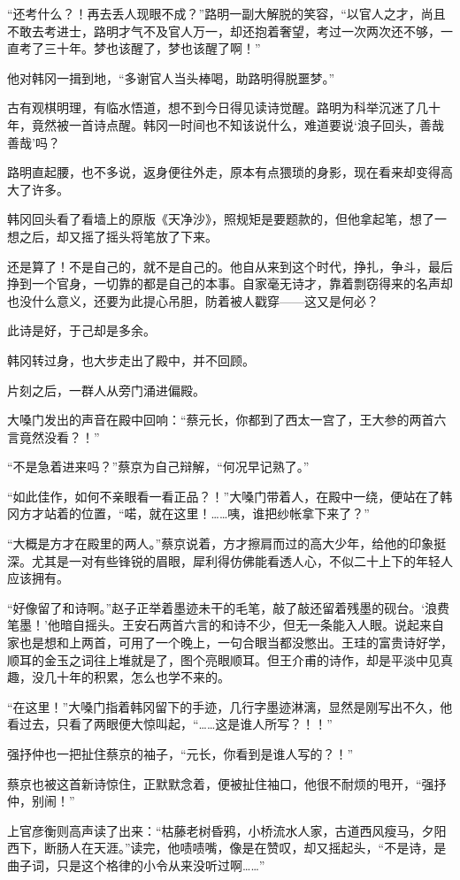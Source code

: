 “还考什么？！再去丢人现眼不成？”路明一副大解脱的笑容，“以官人之才，尚且不敢去考进士，路明才气不及官人万一，却还抱着奢望，考过一次两次还不够，一直考了三十年。梦也该醒了，梦也该醒了啊！”

他对韩冈一揖到地，“多谢官人当头棒喝，助路明得脱噩梦。”

古有观棋明理，有临水悟道，想不到今日得见读诗觉醒。路明为科举沉迷了几十年，竟然被一首诗点醒。韩冈一时间也不知该说什么，难道要说‘浪子回头，善哉善哉’吗？

路明直起腰，也不多说，返身便往外走，原本有点猥琐的身影，现在看来却变得高大了许多。

韩冈回头看了看墙上的原版《天净沙》，照规矩是要题款的，但他拿起笔，想了一想之后，却又摇了摇头将笔放了下来。

还是算了！不是自己的，就不是自己的。他自从来到这个时代，挣扎，争斗，最后挣到一个官身，一切靠的都是自己的本事。自家毫无诗才，靠着剽窃得来的名声却也没什么意义，还要为此提心吊胆，防着被人戳穿——这又是何必？

此诗是好，于己却是多余。

韩冈转过身，也大步走出了殿中，并不回顾。

片刻之后，一群人从旁门涌进偏殿。

大嗓门发出的声音在殿中回响：“蔡元长，你都到了西太一宫了，王大参的两首六言竟然没看？！”

“不是急着进来吗？”蔡京为自己辩解，“何况早记熟了。”

“如此佳作，如何不亲眼看一看正品？！”大嗓门带着人，在殿中一绕，便站在了韩冈方才站着的位置，“喏，就在这里！……咦，谁把纱帐拿下来了？”

“大概是方才在殿里的两人。”蔡京说着，方才擦肩而过的高大少年，给他的印象挺深。尤其是一对有些锋锐的眉眼，犀利得仿佛能看透人心，不似二十上下的年轻人应该拥有。

“好像留了和诗啊。”赵子正举着墨迹未干的毛笔，敲了敲还留着残墨的砚台。‘浪费笔墨！’他暗自摇头。王安石两首六言的和诗不少，但无一条能入人眼。说起来自家也是想和上两首，可用了一个晚上，一句合眼当都没憋出。王珪的富贵诗好学，顺耳的金玉之词往上堆就是了，图个亮眼顺耳。但王介甫的诗作，却是平淡中见真趣，没几十年的积累，怎么也学不来的。

“在这里！”大嗓门指着韩冈留下的手迹，几行字墨迹淋漓，显然是刚写出不久，他看过去，只看了两眼便大惊叫起，“……这是谁人所写？！！”

强抒仲也一把扯住蔡京的袖子，“元长，你看到是谁人写的？！”

蔡京也被这首新诗惊住，正默默念着，便被扯住袖口，他很不耐烦的甩开，“强抒仲，别闹！”

上官彦衡则高声读了出来：“枯藤老树昏鸦，小桥流水人家，古道西风瘦马，夕阳西下，断肠人在天涯。”读完，他啧啧嘴，像是在赞叹，却又摇起头，“不是诗，是曲子词，只是这个格律的小令从来没听过啊……”


